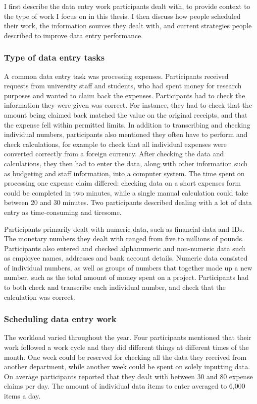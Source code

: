I first describe the data entry work participants dealt with, to provide context to the type of work I focus on in this thesis. I then discuss how people scheduled their work, the information sources they dealt with, and current strategies people described to improve data entry performance.

\subsubsection{Type of data entry tasks}
A common data entry task was processing expenses. Participants received requests from university staff and students, who had spent money for research purposes and wanted to claim back the expenses. Participants had to check the information they were given was correct. For instance, they had to check that the amount being claimed back matched the value on the original receipts, and that the expense fell within permitted limits. In addition to transcribing and checking individual numbers, participants also mentioned they often have to perform and check calculations, for example to check that all individual expenses were converted correctly from a foreign currency. After checking the data and calculations, they then had to enter the data, along with other information such as budgeting and staff information, into a computer system. The time spent on processing one expense claim differed: checking data on a short expenses form could be completed in two minutes, while a single manual calculation could take between 20 and 30 minutes. Two participants described dealing with a lot of data entry as time-consuming and tiresome.

Participants primarily dealt with numeric data, such as financial data and IDs. The monetary numbers they dealt with ranged from five to millions of pounds. Participants also entered and checked alphanumeric and non-numeric data such as employee names, addresses and bank account details. Numeric data consisted of individual numbers, as well as groups of numbers that together made up a new number, such as the total amount of money spent on a project. Participants had to both check and transcribe each individual number, and check that the calculation was correct. 

\subsubsection{Scheduling data entry work}
The workload varied throughout the year. Four participants mentioned that their work followed a work cycle and they did different things at different times of the month. One week could be reserved for checking all the data they received from another department, while another week could be spent on solely inputting data. On average participants reported that they dealt with between 30 and 80 expense claims per day. The amount of individual data items to enter averaged to 6,000 items a day. 

